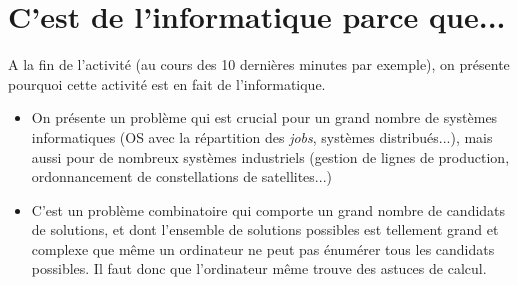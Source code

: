 \documentclass{article}
\begin{document}









\section{C'est de l'informatique parce que...}
A la fin de l'activité (au cours des 10 dernières minutes par exemple), on présente pourquoi cette activité est en fait de l'informatique.
\begin{itemize}
    \item On présente un problème qui est crucial pour un grand nombre de systèmes informatiques (OS avec la répartition des \textit{jobs}, systèmes distribués...), mais aussi pour de nombreux systèmes industriels (gestion de lignes de production, ordonnancement de constellations de satellites...)
    \item C'est un problème combinatoire qui comporte un grand nombre de candidats de solutions, et dont l'ensemble de solutions possibles est tellement grand et complexe que même un ordinateur ne peut pas énumérer tous les candidats possibles. Il faut donc que l'ordinateur même trouve des astuces de calcul.
\end{itemize}
\end{document}
